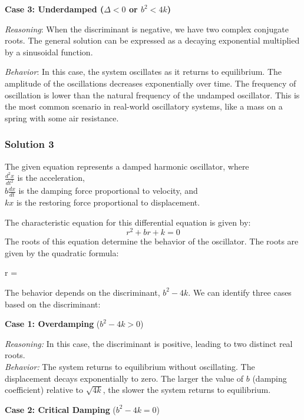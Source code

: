 \documentclass{article}
\begin{document}
\noindent \textbf{Case 3: Underdamped ($\Delta < 0$ or $b^2 < 4k$)}

\textit{Reasoning}: When the discriminant is negative, we have two complex conjugate roots. The general solution can be expressed as a decaying exponential multiplied by a sinusoidal function.

\textit{Behavior}: In this case, the system oscillates as it returns to equilibrium. The amplitude of the oscillations decreases exponentially over time. The frequency of oscillation is lower than the natural frequency of the undamped oscillator. This is the most common scenario in real-world oscillatory systems, like a mass on a spring with some air resistance.

\subsubsection{Solution 3}
\noindent The given equation represents a damped harmonic oscillator, where \\
\(\frac{d^2x}{dt^2}\) is the acceleration, \\
\(b\frac{dx}{dt}\) is the damping force proportional to velocity, and \\
\(kx\) is the restoring force proportional to displacement.

\noindent The characteristic equation for this differential equation is given by:
\begin{equation*}
r^2 + br + k = 0
\end{equation*}
\noindent The roots of this equation determine the behavior of the 
oscillator. The roots are given by the quadratic formula:

r = 

\noindent The behavior depends on the discriminant, \(b^2 - 4k\). We can identify three cases based on the discriminant:

\noindent \textbf{Case 1: Overdamping} (\(b^2 - 4k > 0\))

\noindent \textit{Reasoning:} In this case, the discriminant is positive, leading to two distinct real roots. \\
\textit{Behavior:} The system returns to equilibrium without oscillating. The displacement decays exponentially to zero. The larger the value of \(b\) (damping coefficient) relative to \(\sqrt{4k}\), the slower the system returns to equilibrium.

\noindent \textbf{Case 2: Critical Damping} (\(b^2 - 4k = 0\))
\end{document}
